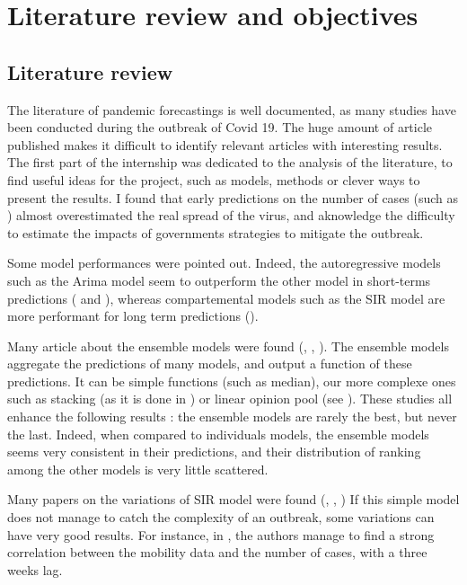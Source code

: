 \section{Literature review and objectives}

\subsection{Literature review}

The literature of pandemic forecastings is well documented, as many studies have been conducted during the outbreak of Covid 19. 
The huge amount of article published makes it difficult to identify relevant articles with interesting results. 
The first part of the internship was dedicated to the analysis of the literature, to find useful ideas for the project, such as models, methods or clever ways to present the results. 
I found that early predictions on the number of cases (such as \cite{gardner2020intervention}) almost overestimated the real spread of the virus, and aknowledge the difficulty to estimate the impacts of governments strategies to mitigate the outbreak. 

Some model performances were pointed out. 
Indeed, the autoregressive models such as the Arima model seem to outperform the other model in short-terms predictions (\cite{kufel2020arima} and \cite{shang2021regional}), whereas compartemental models such as the SIR model are more performant for long term predictions (\cite{rahmandad2022enhancing}).

Many article about the ensemble models were found (\cite{cramer2022evaluation}, \cite{reich2019accuracy}, \cite{howerton2023evaluation}). 
The ensemble models aggregate the predictions of many models, and output a function of these predictions. 
It can be simple functions (such as median), our more complexe ones such as stacking (as it is done in \cite{reich2019accuracy}) or linear opinion pool (see \cite{howerton2023evaluation}).
These studies all enhance the following results : the ensemble models are rarely the best, but never the last. 
Indeed, when compared to individuals models, the ensemble models seems very consistent in their predictions, and their distribution of ranking among the other models is very little scattered. 

Many papers on the variations of SIR model were found (\cite{gerlee2021predicting}, \cite{hult2020estimates}, \cite{sjodin2020covid})
If this simple model does not manage to catch the complexity of an outbreak, some variations can have very good results. 
For instance, in \cite{gerlee2021predicting}, the authors manage to find a strong correlation between the mobility data and the number of cases, with a three weeks lag. 

